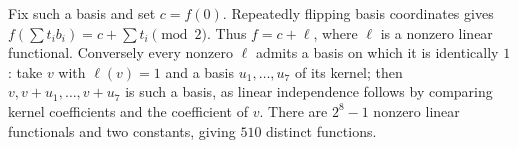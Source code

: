 Fix such a basis and set $c=f(0)$. Repeatedly flipping basis coordinates gives $f(\sum t_ib_i)=c+\sum t_i\pmod2$. Thus $f=c+\ell$, where $\ell$ is a nonzero linear functional. Conversely every nonzero $\ell$ admits a basis on which it is identically $1$: take $v$ with $\ell(v)=1$ and a basis $u_1,\ldots,u_7$ of its kernel; then $v,v+u_1,\ldots,v+u_7$ is such a basis, as linear independence follows by comparing kernel coefficients and the coefficient of $v$. There are $2^8-1$ nonzero linear functionals and two constants, giving $\boxed{510}$ distinct functions.
